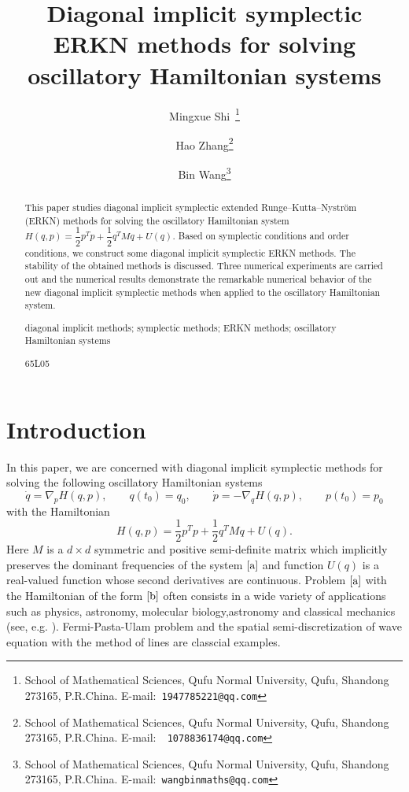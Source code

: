 \documentclass{article}
\title{Diagonal implicit symplectic
 ERKN methods for solving oscillatory
Hamiltonian systems}%
\author{Mingxue Shi\,
\footnote{School of Mathematical Sciences, Qufu Normal University,
Qufu, Shandong 273165, P.R.China. E-mail:~{\tt 1947785221@qq.com}}
\and Hao Zhang\thanks{School of Mathematical Sciences, Qufu Normal
University, Qufu, Shandong 273165, P.R.China. E-mail:~{\tt
1078836174@qq.com}} \and Bin Wang\thanks{School of Mathematical
Sciences, Qufu Normal University, Qufu, Shandong 273165, P.R.China.
E-mail:~{\tt wangbinmaths@qq.com}} }
\def\no{\noindent}
\begin{document}
\maketitle

\begin{abstract} This paper studies diagonal implicit symplectic extended
Runge--Kutta--Nystr\"{o}m (ERKN) methods for solving the oscillatory
Hamiltonian system
$H(q,p)=\dfrac{1}{2}p^{T}p+\dfrac{1}{2}q^{T}Mq+U(q)$. Based on
symplectic conditions and order conditions, we construct some
diagonal implicit symplectic ERKN methods. The stability of the
obtained methods is discussed. Three numerical experiments are
carried out and the numerical results
 demonstrate the remarkable numerical behavior of the
 new diagonal implicit symplectic  methods when applied to the oscillatory Hamiltonian
 system.

\medskip
\no{\bf Keywords:} diagonal implicit methods; symplectic methods;
 ERKN methods; oscillatory Hamiltonian systems

\medskip
\no{\bf MSC:} 65L05

\end{abstract}
\section{Introduction}
In this paper, we are concerned with diagonal implicit symplectic
methods for solving the following oscillatory Hamiltonian systems
\begin{equation}
  \dot{q}=\nabla_{p}H(q,p),\qquad
q(t_0)=q_0,\qquad
 \dot{p}=-\nabla_{q}H(q,p),\qquad p(t_0)=p_0\label{a}%
\end{equation}
with the Hamiltonian
\begin{equation}
H(q,p)=\frac{1}{2}p^{T}p+\frac{1}{2}q^{T}Mq+U(q).\label{b}%
\end{equation}
Here $M$ is a $d\times d$ symmetric and positive semi-definite
matrix which implicitly preserves the dominant frequencies of the
system $\eqref{a}$ and function $U(q)$ is a real-valued function
whose second derivatives are continuous. Problem $\eqref{a}$ with
the Hamiltonian of the form $\eqref{b}$ often consists in a wide
variety of applications such as physics, astronomy, molecular
biology,astronomy and classical mechanics (see, e.g.
\cite{cohen2005bit,garcia2002,B.garcia1999,hairer2000,Hairer2002,
Okunbor1994}). Fermi-Pasta-Ulam problem and the spatial
semi-discretization of wave equation with the method of lines are
classcial examples.
\end{document}
